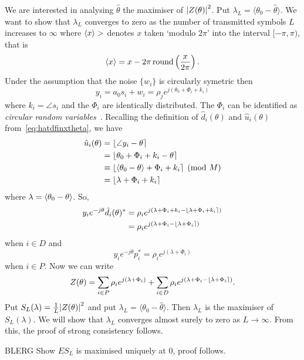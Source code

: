 \documentclass[a4paper,10pt]{article}
\begin{document}
We are interested in analysing $\hat{\theta}$ the maximiser of ${\left| Z(\theta) \right|}^2$.  Put $\lambda_L = \langle\theta_0 - \hat{\theta}\rangle$.  We want to show that $\lambda_L$ converges to zero as the number of transmitted symbols $L$ increases to $\infty$ where $\langle x \rangle>$ denotes $x$ taken `modulo $2\pi$' into the interval $[-\pi, \pi)$, that is
\[
\left\langle x \right\rangle = x - 2\pi\operatorname{round}\left(\frac{x}{2\pi}\right).
\]
Under the assumption that the noise $\{w_i\}$ is circularly symetric then
\[
y_i = a_0 s_i + w_i = \rho_j e^{j ( \theta_0 + \Phi_i + k_i) }
\] 
where $k_i = \angle s_i$ and the $\Phi_i$ are identically distributed.  The $\Phi_i$ can be identified as \emph{circular random variables}~\cite{Mardia_directional_statistics,Fisher1993,McKilliam_mean_dir_est_sq_arc_length2010}.  Recalling the definition of $\hat{d}_i(\theta)$ and $\hat{u}_i(\theta)$ from~\eqref{eq:hatdfinxtheta}, we have
\begin{align*}
\hat{u}_i(\theta) &= {\left\lfloor \angle{y_i} - \theta \right\rceil} \\
&= {\left\lfloor \theta_0 + \Phi_i + k_i - \theta \right\rceil} \\
&\equiv {\left\lfloor  \left\langle \theta_0 - \theta \right\rangle + \Phi_i + k_i \right\rceil} \pmod M \\
&= {\left\lfloor  \lambda + \Phi_i + k_i  \right\rceil} \\
\end{align*}
where $\lambda = \left\langle \theta_0 - \theta \right\rangle$.  So,
\begin{align*}
 y_i e^{-j\theta} \hat{d}_i(\theta)^* &= \rho_i e^{j(\lambda + \Phi_i + k_i - {\left\lfloor \lambda + \Phi_i + k_i \right\rceil})} \\
&= \rho_i e^{j(\lambda + \Phi_i - {\left\lfloor \lambda + \Phi_i \right\rceil})}
\end{align*}
when $i \in D$ and
\[
y_i e^{-j\theta} p_i^* = \rho_i e^{j(\lambda + \Phi_i)}
\]
when $i \in P$.  Now we can write
\[
Z(\theta) = \sum_{i \in P} \rho_i e^{j(\lambda + \Phi_i)} + \sum_{i \in D}  \rho_i e^{j( \lambda + \Phi_i - {\left\lfloor \lambda + \Phi_i \right\rceil})}.
\]
Put $S_L(\lambda) = \frac{1}{L}{\left| Z(\theta) \right|}^2$ and put $\lambda_L = \langle\theta_0 - \hat{\theta}\rangle$.  Then $\lambda_L$ is the maximiser of $S_L(\lambda)$.  We will show that $\lambda_L$ converges almost surely to zero as $L \rightarrow \infty$.  From this, the proof of strong consistency follows.

BLERG  Show $E S_L$ is maximised uniquely at 0, proof follows.
\end{document}
